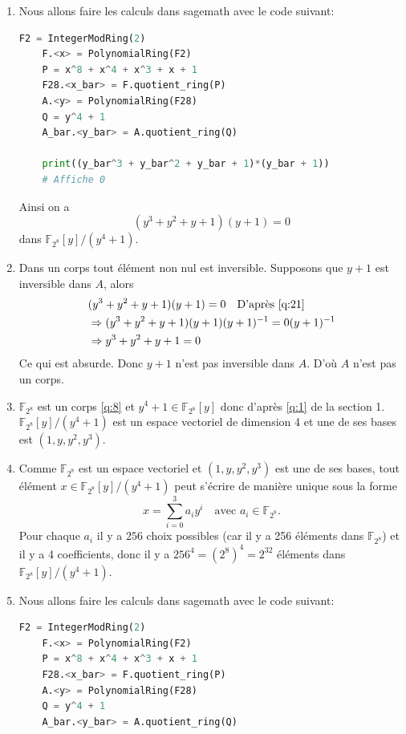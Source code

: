 \documentclass[a4paper, 12pt]{article}
\begin{document}
\begin{enumerate}[label=\textbf{Question \arabic*.}, leftmargin=*]

    \item\label{q:21} Nous allons faire les calculs dans sagemath avec le code suivant:
\begin{lstlisting}[language=Python]
    F2 = IntegerModRing(2)
    F.<x> = PolynomialRing(F2)
    P = x^8 + x^4 + x^3 + x + 1
    F28.<x_bar> = F.quotient_ring(P)
    A.<y> = PolynomialRing(F28)
    Q = y^4 + 1
    A_bar.<y_bar> = A.quotient_ring(Q)

    print((y_bar^3 + y_bar^2 + y_bar + 1)*(y_bar + 1))
    # Affiche 0
\end{lstlisting}

Ainsi on a
$$(y^3 + y^2 + y + 1)(y + 1) = 0$$
dans $\mathbb{F}_{2^8}[y]/(y^4 + 1)$.

    \item Dans un corps tout élément non nul est inversible.
Supposons que $y+1$ est inversible dans $A$, alors
\begin{align*}
    &(y^3 + y^2 + y + 1)(y + 1) = 0 \quad \text{D'après \ref{q:21}} \\
    &\Rightarrow (y^3 + y^2 + y + 1)(y + 1)(y + 1)^{-1} = 0(y + 1)^{-1} \\
    &\Rightarrow y^3 + y^2 + y + 1 = 0
\end{align*}
Ce qui est absurde.
Donc $y + 1$ n'est pas inversible dans $A$.
D'où $A$ n'est pas un corps.

    \item $\mathbb{F}_{2^8}$ est un corps \ref{q:8} et $y^4 + 1 \in \mathbb{F}_{2^8}[y]$ donc
d'après \ref{q:1} de la section 1. $\mathbb{F}_{2^8}[y]/(y^4 + 1)$ est un espace vectoriel de dimension 4
et une de ses bases est $(1, y, y^2, y^3)$.

    \item Comme $\mathbb{F}_{2^8}$ est un espace vectoriel et $(1, y, y^2, y^3)$ est une de ses bases,
tout élément $x \in \mathbb{F}_{2^8}[y]/(y^4 + 1)$ peut s'écrire de manière unique sous la forme
$$
x = \sum\limits_{i=0}^3 a_i y^i \quad \text{avec } a_i \in \mathbb{F}_{2^8}.
$$
Pour chaque $a_i$ il y a $256$ choix possibles (car il y a 256 éléments dans $\mathbb{F}_{2^8}$) et il y a 4 coefficients,
donc il y a $256^4 = (2^8)^4 = 2^{32}$ éléments dans $\mathbb{F}_{2^8}[y]/(y^4 + 1)$.

    \item Nous allons faire les calculs dans sagemath avec le code suivant:
\begin{lstlisting}[language=Python]
    F2 = IntegerModRing(2)
    F.<x> = PolynomialRing(F2)
    P = x^8 + x^4 + x^3 + x + 1
    F28.<x_bar> = F.quotient_ring(P)
    A.<y> = PolynomialRing(F28)
    Q = y^4 + 1
    A_bar.<y_bar> = A.quotient_ring(Q)


\end{lstlisting}
\end{enumerate}
\end{document}
